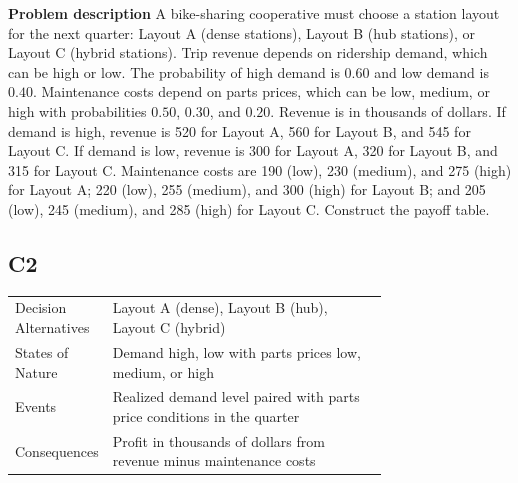 	\begin{ExamProblems}
		\item
		\textbf{Problem description}
		A bike-sharing cooperative must choose a station layout for the next quarter: Layout A (dense stations),
		Layout B (hub stations), or Layout C (hybrid stations). Trip revenue depends on ridership demand,
		which can be high or low. The probability of high demand is $0.60$ and low demand is $0.40$.
		Maintenance costs depend on parts prices, which can be low, medium, or high with probabilities
		$0.50$, $0.30$, and $0.20$. Revenue is in thousands of dollars. If demand is high, revenue is 520 for Layout A,
		560 for Layout B, and 545 for Layout C. If demand is low, revenue is 300 for Layout A, 320 for Layout B,
		and 315 for Layout C. Maintenance costs are 190 (low), 230 (medium), and 275 (high) for Layout A;
		220 (low), 255 (medium), and 300 (high) for Layout B; and 205 (low), 245 (medium), and 285 (high) for Layout C.
		Construct the payoff table.
		
		\subsection*{C2}
		\begin{center}
			\begin{tabular}{l p{0.74\linewidth}}
				\toprule
				Decision Alternatives & Layout A (dense), Layout B (hub), Layout C (hybrid) \\
				States of Nature & Demand high, low with parts prices low, medium, or high \\
				Events & Realized demand level paired with parts price conditions in the quarter \\
				Consequences & Profit in thousands of dollars from revenue minus maintenance costs \\
				\bottomrule
			\end{tabular}
		\end{center}
		

\end{ExamProblems}
